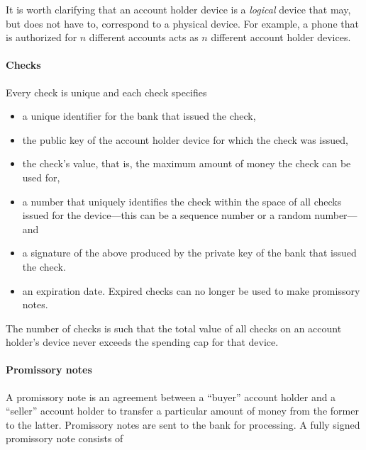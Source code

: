 \documentclass[12pt,a4paper]{article}
\begin{document}
\begin{multicols}{2}
	It is worth clarifying that an account holder device is a \emph{logical} device that may, but does not have to, correspond to a physical device. For example, a phone that is authorized for $n$ different accounts acts as $n$ different account holder devices.

	\paragraph{Checks}
	
	Every check is unique and each check specifies
	
	\begin{itemize}
		\item a unique identifier for the bank that issued the check,
		\item the public key of the account holder device for which the check was issued,
		\item the check's value, that is, the maximum amount of money the check can be used for, 
		\item a number that uniquely identifies the check within the space of all checks issued for the device---this can be a sequence number or a random number---and
		\item a signature of the above produced by the private key of the bank that issued the check. 
		\item an expiration date. Expired checks can no longer be used to make promissory notes.
	\end{itemize}

	The number of checks is such that the total value of all checks on an account holder's device never exceeds the spending cap for that device.

	\paragraph{Promissory notes}
	
	A promissory note is an agreement between a ``buyer'' account holder and a ``seller'' account holder to transfer a particular amount of money from the former to the latter. Promissory notes are sent to the bank for processing. A fully signed promissory note consists of
	

\end{multicols}
\end{document}
